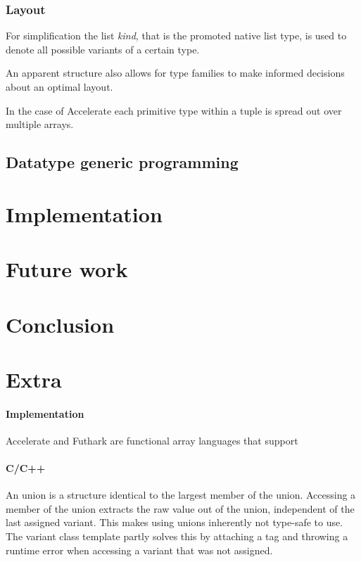 \documentclass{article}
\begin{document}
\newpage

\subsubsection{Layout}

For simplification the list {\it kind}, that is the promoted native list type, is used to denote all possible variants of a certain type.

An apparent structure also allows for type families to make informed decisions about an optimal layout.


In the case of Accelerate each primitive type within a tuple is spread out over multiple arrays.


\subsection{Datatype generic programming}

\newpage

\section{Implementation}

\section{Future work}

\section{Conclusion}

\section{Extra}

\paragraph{Implementation}

Accelerate\cite{accelerate-sum-types} and Futhark\cite{futhark-sum-types} are functional array languages that support 

\paragraph{C/C++}

An union is a structure identical to the largest member of the union.
Accessing a member of the union extracts the raw value out of the union, independent of the last assigned variant.
This makes using unions inherently not type-safe to use.
The variant class template partly solves this by attaching a tag and throwing a runtime error when accessing a variant that was not assigned.
\end{document}
